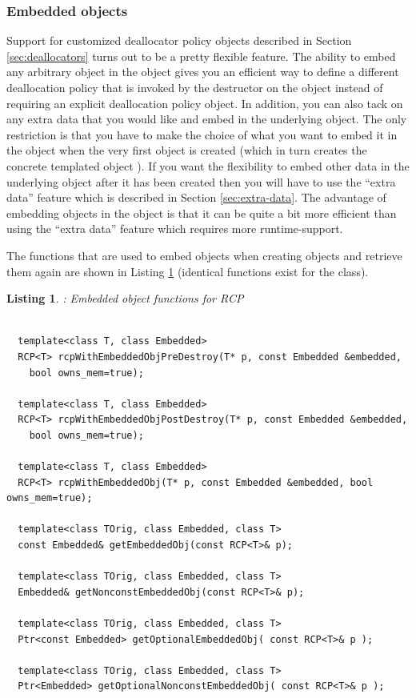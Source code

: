 \documentclass[pdf,ps2pdf,11pt]{SANDreport}
\newtheorem{listing}{Listing}
\begin{document}
%
{}\subsubsection{Embedded objects}
\label{sec:embedded-objecs}
%

Support for customized deallocator policy objects described in Section
{}\ref{sec:deallocators} turns out to be a pretty flexible feature.
The ability to embed any arbitrary object in the {}
object gives you an efficient way to define a different deallocation
policy that is invoked by the destructor on the object instead of
requiring an explicit deallocation policy object.  In addition, you
can also tack on any extra data that you would like and embed in the
underlying {} object.  The only restriction is
that you have to make the choice of what you want to embed it in the
{} object when the very first {} object is
created (which in turn creates the concrete templated
{} object ).  If you want the flexibility to embed
other data in the underlying {} object after it has
been created then you will have to use the ``extra data'' feature
which is described in Section {}\ref{sec:extra-data}.  The advantage
of embedding objects in the {} object is that it
can be quite a bit more efficient than using the ``extra data''
feature which requires more runtime-support.

The functions that are used to embed objects when creating
{} objects and retrieve them again are shown in Listing
{}\ref{listing:RCP-embedded-obj} (identical functions exist for the
{} class).

\begin{listing}: Embedded object functions for RCP \\
\label{listing:RCP-embedded-obj}
{\small\begin{verbatim}
 
  template<class T, class Embedded>
  RCP<T> rcpWithEmbeddedObjPreDestroy(T* p, const Embedded &embedded,
    bool owns_mem=true);
  
  template<class T, class Embedded>
  RCP<T> rcpWithEmbeddedObjPostDestroy(T* p, const Embedded &embedded,
    bool owns_mem=true);
  
  template<class T, class Embedded>
  RCP<T> rcpWithEmbeddedObj(T* p, const Embedded &embedded, bool owns_mem=true);
  
  template<class TOrig, class Embedded, class T> 
  const Embedded& getEmbeddedObj(const RCP<T>& p);
  
  template<class TOrig, class Embedded, class T>
  Embedded& getNonconstEmbeddedObj(const RCP<T>& p);
  
  template<class TOrig, class Embedded, class T>
  Ptr<const Embedded> getOptionalEmbeddedObj( const RCP<T>& p );
  
  template<class TOrig, class Embedded, class T>
  Ptr<Embedded> getOptionalNonconstEmbeddedObj( const RCP<T>& p );
\end{verbatim}}
\end{listing}
\end{document}
